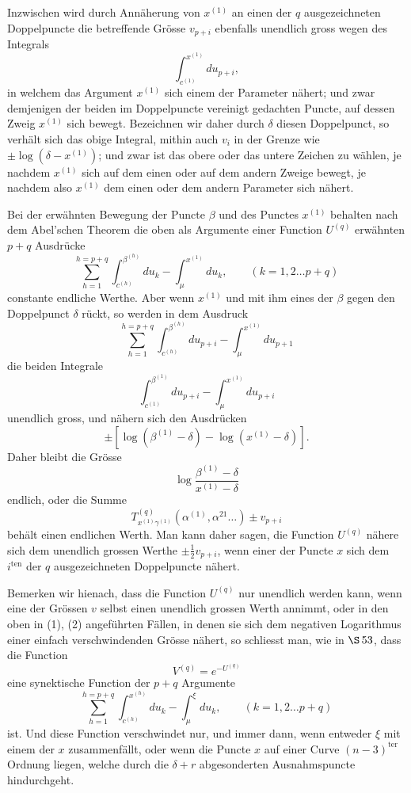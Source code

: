 \documentclass[10pt]{article}
\begin{document}
Inzwischen wird durch Annäherung von \(x^{(1)}\) an einen der \(q\) ausgezeichneten Doppelpuncte die betreffende Grösse \(v_{p+i}\) ebenfalls unendlich gross wegen des Integrals
\[
\int_{c^{(1)}}^{x^{(1)}}du_{p+i},
\]
in welchem das Argument \(x^{(1)}\) sich einem der Parameter nähert; und zwar demjenigen der beiden im Doppelpuncte vereinigt gedachten Puncte, auf dessen Zweig \(x^{(1)}\) sich bewegt. Bezeichnen wir daher durch \(\delta\) diesen Doppelpunct, so verhält sich das obige Integral, mithin auch \(v_i\) in der Grenze wie \(\pm\log(\delta-x^{(1)})\); und zwar ist das obere oder das untere Zeichen zu wählen, je nachdem \(x^{(1)}\) sich auf dem einen oder auf dem andern Zweige bewegt, je nachdem also \(x^{(1)}\) dem einen oder dem andern Parameter sich nähert.

Bei der erwähnten Bewegung der Puncte \(\beta\) und des Punctes \(x^{(1)}\) behalten nach dem Abel'schen Theorem die oben als Argumente einer Function \(U^{(q)}\) erwähnten \(p+q\) Ausdrücke
\[
\sum_{h=1}^{h=p+q}\int_{c^{(h)}}^{\beta^{(h)}}du_k-\int_{\mu}^{x^{(1)}}du_k,
\qquad (k=1,2\ldots p+q)
\]
constante endliche Werthe. Aber wenn \(x^{(1)}\) und mit ihm eines der \(\beta\) gegen den Doppelpunct \(\delta\) rückt, so werden in dem Ausdruck
\[
\sum_{h=1}^{h=p+q}\int_{c^{(h)}}^{\beta^{(h)}}du_{p+i}-\int_{\mu}^{x^{(1)}}du_{p+1}
\]
die beiden Integrale
\[
\int_{c^{(1)}}^{\beta^{(1)}}du_{p+i}-\int_{\mu}^{x^{(1)}}du_{p+i}
\]
unendlich gross, und nähern sich den Ausdrücken
\[
\pm\left[\log(\beta^{(1)}-\delta)-\log(x^{(1)}-\delta)\right].
\]
Daher bleibt die Grösse
\[
\log\frac{\beta^{(1)}-\delta}{x^{(1)}-\delta}
\]
endlich, oder die Summe
\[
T_{x^{(1)}\gamma^{(1)}}^{(q)}(\alpha^{(1)},\alpha^{21}\ldots)\pm v_{p+i}
\]
behält einen endlichen Werth. Man kann daher sagen, die Function \(U^{(q)}\) nähere sich dem unendlich grossen Werthe \(\pm\frac12v_{p+i}\), wenn einer der Puncte \(x\) sich dem \(i^{\mathrm{ten}}\) der \(q\) ausgezeichneten Doppelpuncte nähert.

Bemerken wir hienach, dass die Function \(U^{(q)}\) nur unendlich werden kann, wenn eine der Grössen \(v\) selbst einen unendlich grossen Werth annimmt, oder in den oben in (1), (2) angeführten Fällen, in denen sie sich dem negativen Logarithmus einer einfach verschwindenden Grösse nähert, so schliesst man, wie in \(\S\,53\), dass die Function
\[
V^{(q)}=e^{-U^{(q)}}
\]
eine synektische Function der \(p+q\) Argumente
\[
\sum_{h=1}^{h=p+q}\int_{c^{(h)}}^{x^{(h)}}du_k-\int_{\mu}^{\xi}du_k,
\qquad (k=1,2\ldots p+q)
\]
ist. Und diese Function verschwindet nur, und immer dann, wenn entweder \(\xi\) mit einem der \(x\) zusammenfällt, oder wenn die Puncte \(x\) auf einer Curve \((n-3)^{\mathrm{ter}}\) Ordnung liegen, welche durch die \(\delta+r\) abgesonderten Ausnahmspuncte hindurchgeht.
\end{document}
